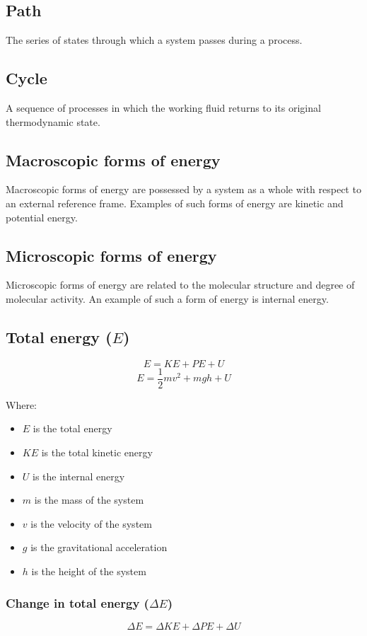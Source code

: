 \documentclass[11pt]{article}
\begin{document}
\subsection{Path}
\label{sec:org41833aa}
The series of states through which a system passes during a process.

\subsection{Cycle}
\label{sec:orgf77ba57}
A sequence of processes in which the working fluid returns to its original thermodynamic state.

\subsection{Macroscopic forms of energy}
\label{sec:org755e7ba}
Macroscopic forms of energy are possessed by a system as a whole with respect to an external reference frame. Examples of such forms of energy are kinetic and potential energy.

\subsection{Microscopic forms of energy}
\label{sec:orgc1855b7}
Microscopic forms of energy are related to the molecular structure and degree of molecular activity. An example of such a form of energy is internal energy.

\newpage

\subsection{Total energy (\(E\))}
\label{sec:orga0c6368}
\[E = KE + PE + U\]
\[E = \frac{1}{2} mv^2 + mgh + U\]

Where:
\begin{itemize}
\item \(E\) is the total energy
\item \(KE\) is the total kinetic energy
\item \(U\) is the internal energy
\item \(m\) is the mass of the system
\item \(v\) is the velocity of the system
\item \(g\) is the gravitational acceleration
\item \(h\) is the height of the system
\end{itemize}

\subsubsection{Change in total energy (\(\Delta E\))}
\label{sec:orgc8a0d72}
\[\Delta E = \Delta KE + \Delta PE + \Delta U\]
\end{document}
